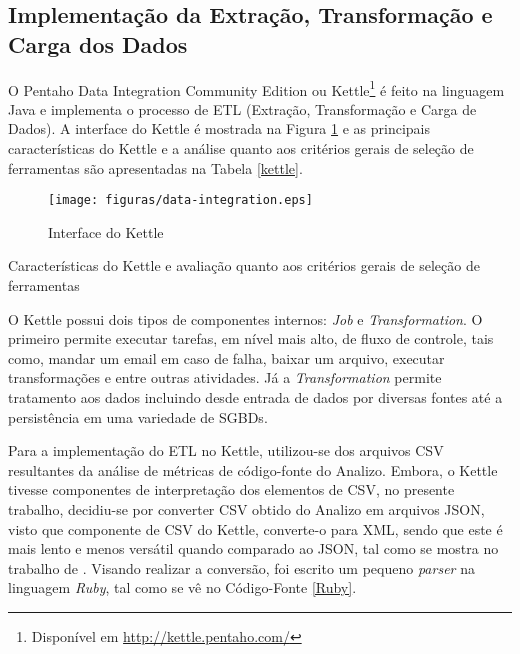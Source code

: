\subsection{Implementação da Extração, Transformação e Carga dos Dados}
\label{implementação-ETL}
O Pentaho Data Integration Community Edition ou Kettle\footnote{Disponível em \url{http://kettle.pentaho.com/}} é feito na linguagem Java e implementa o processo de ETL (Extração, Transformação e Carga de Dados). A interface do Kettle é mostrada na Figura \ref{pdi} e as principais características do Kettle e a análise quanto aos critérios gerais de seleção de ferramentas são apresentadas na Tabela \ref{kettle}.

\begin{figure}[ht!]
\centering
\texttt{[image: figuras/data-integration.eps]}
\caption{Interface do Kettle}
\label{pdi}
\end{figure}
\FloatBarrier
 

\begin{table}[!ht]

\caption{Características do Kettle e avaliação quanto aos critérios gerais de seleção de ferramentas}
\label{kettle}
\end{table}
\FloatBarrier	

O Kettle possui dois tipos de componentes internos: \textit{Job} e \textit{Transformation}. O primeiro permite executar tarefas, em nível mais alto, de fluxo de controle, tais como, mandar um email em caso de falha, baixar um arquivo, executar transformações  e entre outras atividades. Já a \textit{Transformation} permite tratamento aos dados incluindo desde entrada de dados por diversas fontes até a persistência em uma variedade de SGBDs.


Para a implementação do ETL no Kettle, utilizou-se dos arquivos CSV resultantes da análise de métricas de código-fonte do Analizo. Embora, o Kettle tivesse componentes de interpretação dos elementos de CSV, no presente trabalho, decidiu-se por converter CSV obtido do Analizo em arquivos JSON, visto que componente de CSV do Kettle, converte-o para XML, sendo que este é mais lento e menos versátil quando comparado ao JSON, tal como se mostra no trabalho de . Visando realizar a conversão, foi escrito um pequeno \textit{parser} na linguagem \textit{Ruby}, tal como se vê no Código-Fonte \ref{Ruby}.

\begin{center}
\begin{minipage}{0.5\textwidth}

\end{minipage}
\end{center}

